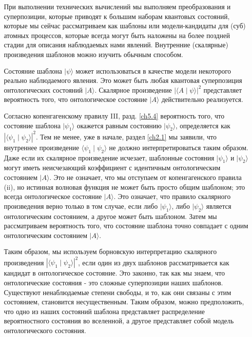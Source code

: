 \documentclass[main.tex]{subfiles}
\begin{document}
При выполнении технических вычислений мы выполняем преобразования и суперпозиции, которые приводят к большим наборам квантовых состояний, которые мы сейчас рассматриваем как шаблоны или модели-кандидаты для (суб) атомных процессов, которые всегда могут быть наложены на более поздней стадии для описания наблюдаемых нами явлений. Внутренние (скалярные) произведения шаблонов можно изучить обычным способом.

Состояние шаблона $\mid \psi \rangle$ может использоваться в качестве модели некоторого реально наблюдаемого явления. Это может быть любая квантовая суперпозиция онтологических состояний $\mid A \rangle$. Скалярное произведение $|\langle A \mid \psi \rangle|^2$ представляет вероятность того, что онтологическое состояние $\mid A \rangle$ действительно реализуется.

Согласно копенгагенскому правилу III, разд. \ref{ch5.4} вероятность того, что состояние шаблона $\mid \psi_1 \rangle$ окажется равным состоянию $\mid \psi_2 \rangle$, определяется как $|\langle \psi_1 \mid \psi_2 \rangle|^2$. Тем не менее, уже в начале, раздел \ref{ch2.1} мы заявили, что внутреннее произведение $\langle \psi_1 \mid \psi_2 \rangle$ не должно интерпретироваться таким образом. Даже если их скалярное произведение исчезает, шаблонные состояния $\mid \psi_1 \rangle$ и $\mid \psi_2 \rangle$ могут иметь неисчезающий коэффициент с идентичным онтологическим состоянием $\mid A \rangle$. Это не означает, что мы отступаем от копенгагенского правила (ii), но истинная волновая функция не может быть просто общим шаблоном; это всегда онтологическое состояние $\mid A \rangle$. Это означает, что правило скалярного произведения верно только в том случае, если либо $\mid \psi_1 \rangle$, либо $\mid \psi_2 \rangle$ является онтологическим состоянием, а другое может быть шаблоном. Затем мы рассматриваем вероятность того, что состояние шаблона точно совпадает с одним онтологическим состоянием $\mid A \rangle$.

Таким образом, мы используем борновскую интерпретацию скалярного произведения $|\langle \psi_1 \mid \psi_2 \rangle|^2$, если один из двух шаблонов рассматривается как кандидат в онтологическое состояние. Это законно, так как мы знаем, что онтологические состояния - это сложные суперпозиции наших шаблонов. Существуют ненаблюдаемые степени свободы, и то, как они связаны с этим состоянием, становится несущественным. Таким образом, можно предположить, что одно из наших состояний шаблона представляет распределение вероятностного состояния во вселенной, а другое представляет собой модель онтологического состояния.
\end{document}
